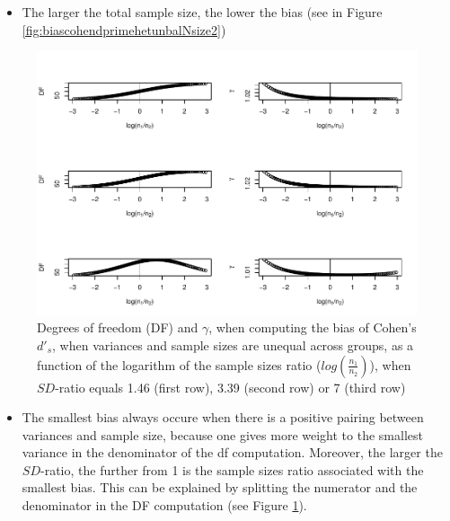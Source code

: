 \documentclass[
  man]{apa6}
\providecommand{\tightlist}{%
  \setlength{\itemsep}{0pt}\setlength{\parskip}{0pt}}
\begin{document}
\begin{itemize}
\tightlist
\item
  The larger the total sample size, the lower the bias (see in Figure \ref{fig:biascohendprimehetunbalNsize2})
\end{itemize}

\begin{figure}
\centering
\includegraphics{Theoretical-Bias-of-all-estimators-as-a-function-of-population-parameters_files/figure-latex/biascohendprimehetunbaldfandbias-1.pdf}
\caption{\label{fig:biascohendprimehetunbaldfandbias}Degrees of freedom (DF) and \(\gamma\), when computing the bias of Cohen's \(d'_s\), when variances and sample sizes are unequal across groups, as a function of the logarithm of the sample sizes ratio (\(log \left( \frac{n_1}{n_2} \right)\)), when \(SD\)-ratio equals 1.46 (first row), 3.39 (second row) or 7 (third row)}
\end{figure}

\begin{itemize}
\tightlist
\item
  The smallest bias always occure when there is a positive pairing between variances and sample size, because one gives more weight to the smallest variance in the denominator of the df computation. Moreover, the larger the \(SD\)-ratio, the further from 1 is the sample sizes ratio associated with the smallest bias. This can be explained by splitting the numerator and the denominator in the DF computation (see Figure \ref{fig:biascohendprimehetunbaldfandbias}).
\end{itemize}
\end{document}
